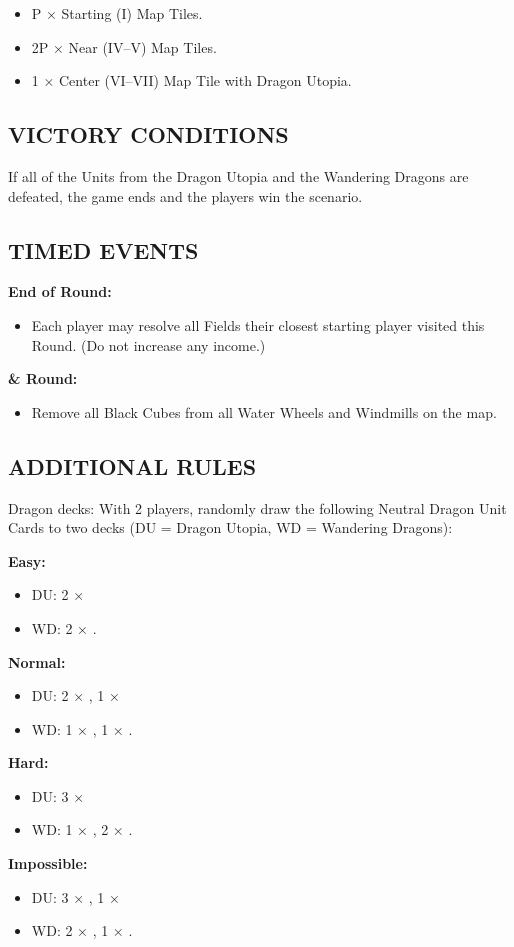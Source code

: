 \begin{multicols*}{2}
\begin{itemize}
  \item P × Starting (I) Map Tiles.
  \item 2P × Near (IV–V) Map Tiles.
  \item 1 × Center (VI–VII) Map Tile with Dragon Utopia.
\end{itemize}

\subsection*{\MakeUppercase{Victory Conditions}}
If all of the Units from the Dragon Utopia and the Wandering Dragons are defeated, the game ends and the players win the scenario.

\subsection*{\MakeUppercase{Timed Events}}
\textbf{End of  Round:}
\begin{itemize}
  \item Each player may resolve all Fields their closest starting player visited this Round. (Do not increase any income.)
\end{itemize}
\textbf{ \&  Round:}
\begin{itemize}
  \item Remove all Black Cubes from all Water Wheels and Windmills on the map.
\end{itemize}

\subsection*{\MakeUppercase{Additional Rules}}
Dragon decks: With 2 players, randomly draw the following Neutral Dragon Unit Cards to two decks (DU = Dragon Utopia, WD = Wandering Dragons):

\textbf{Easy:}
\begin{itemize}
  \item DU: 2 × \azure\
  \item WD: 2 × \golden.
\end{itemize}
\textbf{Normal:}
\begin{itemize}
  \item DU: 2 × \azure, 1 × \golden\
  \item WD: 1 × \azure, 1 × \golden.
\end{itemize}
\textbf{Hard:}
\begin{itemize}
  \item DU: 3 × \azure\
  \item WD: 1 × \azure, 2 × \golden.
\end{itemize}
\textbf{Impossible:}
\begin{itemize}
  \item DU: 3 × \azure, 1 × \golden\
  \item WD: 2 × \azure, 1 × \golden.
\end{itemize}


\end{multicols*}

